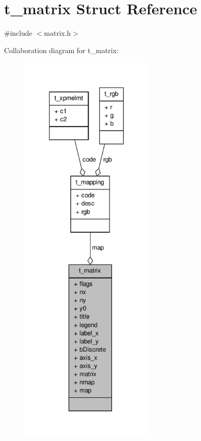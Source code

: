 \hypertarget{structt__matrix}{\section{t\-\_\-matrix \-Struct \-Reference}
\label{structt__matrix}
}


{\ttfamily \#include $<$matrix.\-h$>$}



\-Collaboration diagram for t\-\_\-matrix\-:
\nopagebreak
\begin{figure}[H]
\begin{center}
\leavevmode
\includegraphics[height=550pt]{structt__matrix__coll__graph}
\end{center}
\end{figure}
